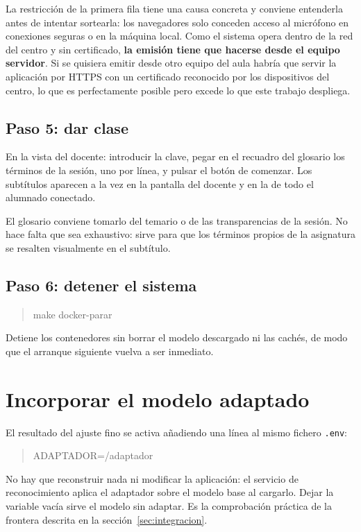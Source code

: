 La restricción de la primera fila tiene una causa concreta y conviene entenderla antes de
intentar sortearla: los navegadores solo conceden acceso al micrófono en conexiones seguras
o en la máquina local. Como el sistema opera dentro de la red del centro y sin certificado,
\textbf{la emisión tiene que hacerse desde el equipo servidor}. Si se quisiera emitir desde
otro equipo del aula habría que servir la aplicación por HTTPS con un certificado
reconocido por los dispositivos del centro, lo que es perfectamente posible pero excede lo
que este trabajo despliega.

\subsection*{Paso 5: dar clase}

En la vista del docente: introducir la clave, pegar en el recuadro del glosario los términos
de la sesión, uno por línea, y pulsar el botón de comenzar. Los subtítulos aparecen a la vez
en la pantalla del docente y en la de todo el alumnado conectado.

El glosario conviene tomarlo del temario o de las transparencias de la sesión. No hace falta
que sea exhaustivo: sirve para que los términos propios de la asignatura se resalten
visualmente en el subtítulo.

\subsection*{Paso 6: detener el sistema}

\begin{quote}\ttfamily
make docker-parar
\end{quote}

Detiene los contenedores sin borrar el modelo descargado ni las cachés, de modo que el
arranque siguiente vuelva a ser inmediato.

\section{Incorporar el modelo adaptado}

El resultado del ajuste fino se activa añadiendo una línea al mismo fichero \texttt{.env}:

\begin{quote}\ttfamily
ADAPTADOR=/adaptador
\end{quote}

No hay que reconstruir nada ni modificar la aplicación: el servicio de reconocimiento aplica
el adaptador sobre el modelo base al cargarlo. Dejar la variable vacía sirve el modelo sin
adaptar. Es la comprobación práctica de la frontera descrita en la
sección~\ref{sec:integracion}.

